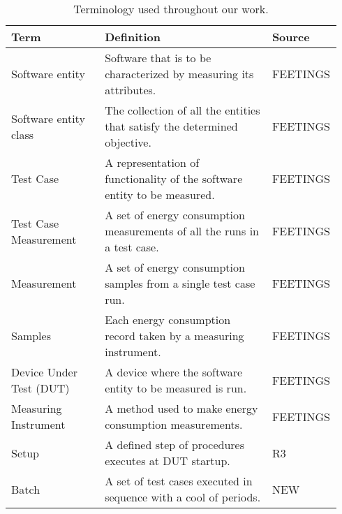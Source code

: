 
\begin{table}[ht]
    \begin{tabular}{| p{0.29\linewidth} | p{0.5\linewidth}| p{0.15\linewidth}|}
        \hline
        \textbf{Term}           & \textbf{Definition}                                                       & \textbf{Source} \\ \hline
        Software entity         & Software that is to be characterized by measuring its attributes.         & FEETINGS\cite{GarciaFEETINGS}        \\ \hline
        Software entity class   & The collection of all the entities that satisfy the determined objective. & FEETINGS\cite{GarciaFEETINGS}        \\ \hline
        Test Case               & A representation of functionality of the software entity to be measured.  & FEETINGS\cite{GarciaFEETINGS}         \\ \hline
        Test Case Measurement    & A set of energy consumption measurements of all the runs in a test case.  & FEETINGS\cite{GarciaFEETINGS}         \\ \hline
        Measurement             & A set of energy consumption samples from a single test case run.       & FEETINGS\cite{GarciaFEETINGS}         \\ \hline
        Samples                 & Each energy consumption record taken by a measuring instrument.           & FEETINGS\cite{GarciaFEETINGS}         \\ \hline
        Device Under Test (DUT) & A device where the software entity to be measured is run.                 & FEETINGS\cite{GarciaFEETINGS}         \\ \hline
        Measuring Instrument    & A method used to make energy consumption measurements.                    & FEETINGS\cite{GarciaFEETINGS}         \\ \hline
        Setup                   & A defined step of procedures executes at DUT startup.                     & R3\cite{Bokhari2020r3}              \\ \hline
        Batch\                  & A set of test cases executed in sequence with a cool of periods.            & NEW             \\ \hline
    
    \end{tabular}
    \caption{Terminology used throughout our work.}
    \label{tab:TerminologyAlert}
    \end{table}